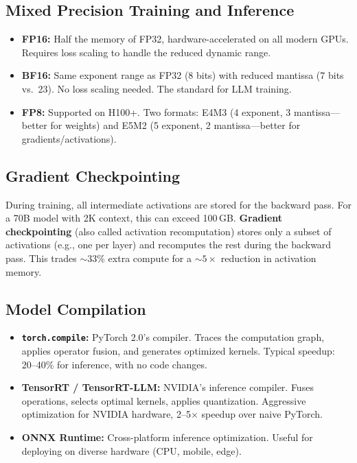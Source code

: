 \subsection{Mixed Precision Training and Inference}

\begin{itemize}
    \item \textbf{FP16:}  Half the memory of FP32, hardware-accelerated on all modern GPUs.
          Requires loss scaling to handle the reduced dynamic range.
    \item \textbf{BF16:}  Same exponent range as FP32 (8 bits) with reduced mantissa
          (7 bits vs.\ 23).  No loss scaling needed.  The standard for LLM training.
    \item \textbf{FP8:}  Supported on H100+.  Two formats: E4M3 (4 exponent, 3 mantissa---better
          for weights) and E5M2 (5 exponent, 2 mantissa---better for gradients/activations).
\end{itemize}

\subsection{Gradient Checkpointing}

During training, all intermediate activations are stored for the backward pass.  For a
70B model with 2K context, this can exceed 100\,GB.  \textbf{Gradient checkpointing}
(also called activation recomputation) stores only a subset of activations (e.g., one
per layer) and recomputes the rest during the backward pass.  This trades $\sim$$33\%$
extra compute for a $\sim$$5\times$ reduction in activation memory.

\subsection{Model Compilation}

\begin{itemize}
    \item \textbf{\texttt{torch.compile}:} PyTorch 2.0's compiler.  Traces the
          computation graph, applies operator fusion, and generates optimized kernels.
          Typical speedup: 20--40\% for inference, with no code changes.
    \item \textbf{TensorRT / TensorRT-LLM:} NVIDIA's inference compiler.  Fuses operations,
          selects optimal kernels, applies quantization.  Aggressive optimization for
          NVIDIA hardware, 2--5$\times$ speedup over naive PyTorch.
    \item \textbf{ONNX Runtime:} Cross-platform inference optimization.  Useful for
          deploying on diverse hardware (CPU, mobile, edge).
\end{itemize}


